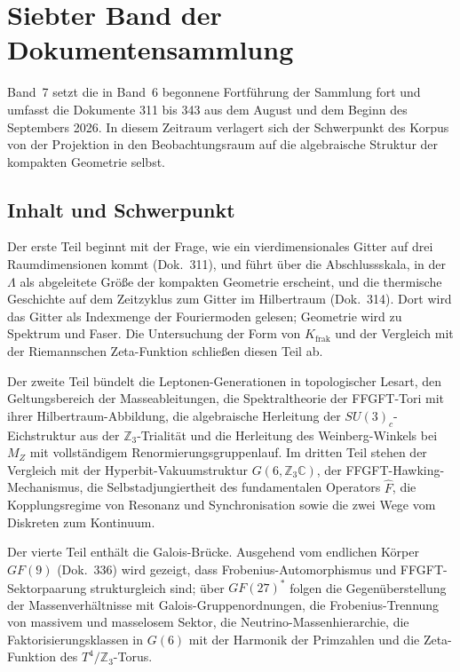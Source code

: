 
\section*{Siebter Band der Dokumentensammlung}

Band~7 setzt die in Band~6 begonnene Fortführung der Sammlung fort und umfasst
die Dokumente 311 bis 343 aus dem August und dem Beginn des Septembers 2026.
In diesem Zeitraum verlagert sich der Schwerpunkt des Korpus von der
Projektion in den Beobachtungsraum auf die algebraische Struktur der kompakten
Geometrie selbst.

\subsection*{Inhalt und Schwerpunkt}

Der erste Teil beginnt mit der Frage, wie ein vierdimensionales Gitter auf drei
Raumdimensionen kommt (Dok.~311), und führt über die Abschlussskala, in der
$\Lambda$ als abgeleitete Größe der kompakten Geometrie erscheint, und die
thermische Geschichte auf dem Zeitzyklus zum Gitter im Hilbertraum
(Dok.~314). Dort wird das Gitter als Indexmenge der Fouriermoden gelesen;
Geometrie wird zu Spektrum und Faser. Die Untersuchung der Form von
$K_\text{frak}$ und der Vergleich mit der Riemannschen Zeta-Funktion schließen
diesen Teil ab.

Der zweite Teil bündelt die Leptonen-Generationen in topologischer Lesart, den
Geltungsbereich der Masseableitungen, die Spektraltheorie der FFGFT-Tori mit
ihrer Hilbertraum-Abbildung, die algebraische Herleitung der
$SU(3)_c$-Eichstruktur aus der $\mathbb{Z}_3$-Trialität und die Herleitung des
Weinberg-Winkels bei $M_Z$ mit vollständigem Renormierungsgruppenlauf. Im
dritten Teil stehen der Vergleich mit der Hyperbit-Vakuumstruktur
$G(6,\mathbb{Z}_3\mathbb{C})$, der FFGFT-Hawking-Mechanismus, die
Selbstadjungiertheit des fundamentalen Operators $\hat F$, die
Kopplungsregime von Resonanz und Synchronisation sowie die zwei Wege vom
Diskreten zum Kontinuum.

Der vierte Teil enthält die Galois-Brücke. Ausgehend vom endlichen Körper
$GF(9)$ (Dok.~336) wird gezeigt, dass Frobenius-Automorphismus und
FFGFT-Sektorpaarung strukturgleich sind; über $GF(27)^*$ folgen die
Gegenüberstellung der Massenverhältnisse mit Galois-Gruppenordnungen, die
Frobenius-Trennung von massivem und masselosem Sektor, die
Neutrino-Massenhierarchie, die Faktorisierungsklassen in $G(6)$ mit der
Harmonik der Primzahlen und die Zeta-Funktion des $T^4/\mathbb{Z}_3$-Torus.

